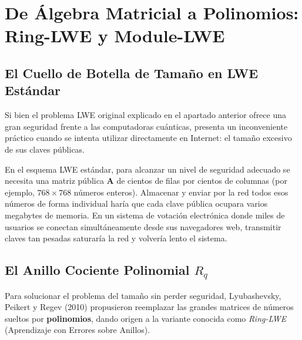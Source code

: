 \section{De Álgebra Matricial a Polinomios: Ring-LWE y Module-LWE}

\subsection{El Cuello de Botella de Tamaño en LWE Estándar}

Si bien el problema LWE original explicado en el apartado anterior ofrece una gran seguridad frente a las computadoras cuánticas, presenta un inconveniente práctico cuando se intenta utilizar directamente en Internet: el tamaño excesivo de sus claves públicas.

En el esquema LWE estándar, para alcanzar un nivel de seguridad adecuado se necesita una matriz pública $\mathbf{A}$ de cientos de filas por cientos de columnas (por ejemplo, $768 \times 768$ números enteros). Almacenar y enviar por la red todos esos números de forma individual haría que cada clave pública ocupara varios megabytes de memoria. En un sistema de votación electrónica donde miles de usuarios se conectan simultáneamente desde sus navegadores web, transmitir claves tan pesadas saturaría la red y volvería lento el sistema.

\subsection{El Anillo Cociente Polinomial \texorpdfstring{$R_q$}{Rq}}

Para solucionar el problema del tamaño sin perder seguridad, Lyubashevsky, Peikert y Regev (2010) propusieron reemplazar las grandes matrices de números sueltos por \textbf{polinomios}, dando origen a la variante conocida como \textit{Ring-LWE} (Aprendizaje con Errores sobre Anillos).


